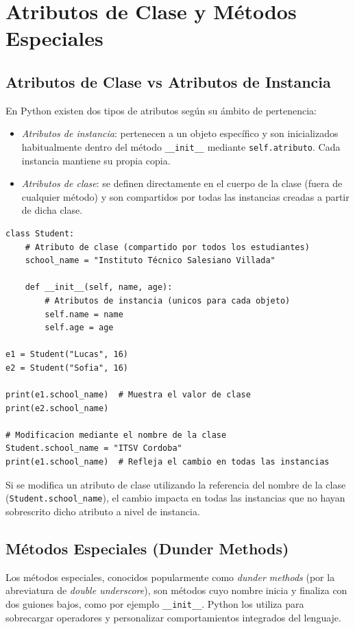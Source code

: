 \chapter{Atributos de Clase y Métodos Especiales}

\section{Atributos de Clase vs Atributos de Instancia}
En Python existen dos tipos de atributos según su ámbito de pertenencia:

\begin{itemize}[leftmargin=*]
  \item \textit{Atributos de instancia}: pertenecen a un objeto específico y son inicializados habitualmente
    dentro del método \texttt{\_\_init\_\_} mediante \texttt{self.atributo}. Cada instancia mantiene su propia copia.
  \item \textit{Atributos de clase}: se definen directamente en el cuerpo de la clase (fuera de cualquier método)
    y son compartidos por todas las instancias creadas a partir de dicha clase.
\end{itemize}

\begin{lstlisting}[caption={Diferencia entre atributos de clase y de instancia.}, label={list:atributos_clase}]
class Student:
    # Atributo de clase (compartido por todos los estudiantes)
    school_name = "Instituto Técnico Salesiano Villada"

    def __init__(self, name, age):
        # Atributos de instancia (unicos para cada objeto)
        self.name = name
        self.age = age

e1 = Student("Lucas", 16)
e2 = Student("Sofia", 16)

print(e1.school_name)  # Muestra el valor de clase
print(e2.school_name)

# Modificacion mediante el nombre de la clase
Student.school_name = "ITSV Cordoba"
print(e1.school_name)  # Refleja el cambio en todas las instancias
\end{lstlisting}

Si se modifica un atributo de clase utilizando la referencia del nombre de la clase (\texttt{Student.school\_name}),
el cambio impacta en todas las instancias que no hayan sobrescrito dicho atributo a nivel de instancia.

\section{Métodos Especiales (Dunder Methods)}
Los métodos especiales, conocidos popularmente como \textit{dunder methods} (por la abreviatura de \textit{double underscore}),
son métodos cuyo nombre inicia y finaliza con dos guiones bajos, como por ejemplo \texttt{\_\_init\_\_}.
Python los utiliza para sobrecargar operadores y personalizar comportamientos integrados del lenguaje.

